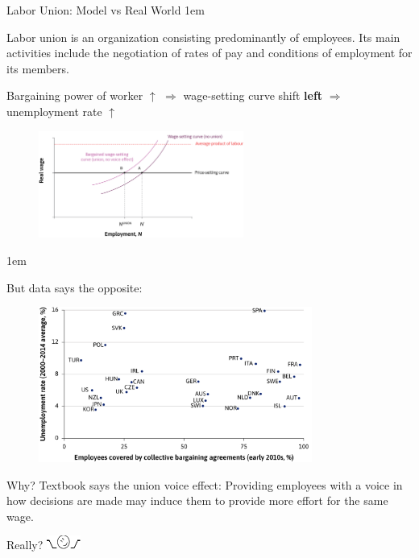 \documentclass[11pt,aspectratio=43,usenames,dvipsnames]{beamer}
\let\olditemize=\itemize
\let\endolditemize=\enditemize
\renewenvironment{itemize}{\olditemize \itemsep1em}{\endolditemize}
\theoremstyle{definition}
\begin{document}
\begin{frame}[allowframebreaks]{Labor Union: Model vs Real World}
\label{slide:Labor_Union}
    \begin{itemize}
        \item Labor union is an organization consisting predominantly of employees. Its main activities include the negotiation of rates of pay and conditions of employment for its members.
        \item Bargaining power of worker $ \uparrow  $ $ \Rightarrow  $ wage-setting curve shift \textbf{left} $ \Rightarrow  $ unemployment rate $ \uparrow  $
    \end{itemize}
    \begin{figure}
        \centering
        \includegraphics[width=0.6\textwidth]{./figures/LaborUnion_1.png}
    \end{figure}

    \framebreak

    \begin{itemize}
        \item But data says the opposite:
    \end{itemize}
    \begin{figure}
        \centering
        \includegraphics[width=0.8\textwidth]{./figures/LaborUnion_2.png}
    \end{figure}

    \framebreak

    Why? Textbook says the \alert{union voice effect}: Providing employees with a voice in how decisions are made may induce them to provide \alert{more effort for the same wage}.

    \begin{center}
        Really? \includegraphics[width=3em]{./figures/build/shrug.pdf}
    \end{center}


\end{frame}
\end{document}
